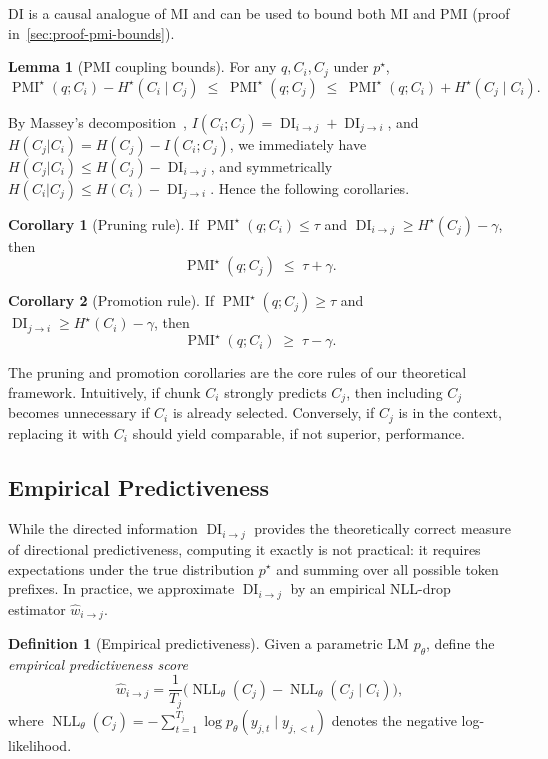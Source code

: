 \documentclass{article} %
\theoremstyle{definition}
\newtheorem{definition}{Definition}[section]
\newtheorem{corollary}{Corollary}[theorem]
\newtheorem{lemma}[theorem]{Lemma}
\DeclareMathOperator{\NLL}{NLL}
\DeclareMathOperator{\DI}{DI}
\DeclareMathOperator{\PMI}{PMI}
\begin{document}
DI is a causal analogue of MI and can be used to bound both MI and PMI (proof in~\ref{sec:proof-pmi-bounds}).

\begin{lemma}[PMI coupling bounds]
\label{thm:coupling}
For any $q,C_i,C_j$ under $p^\star$,
\[
\operatorname{PMI}^\star(q;C_i) - H^\star(C_i\mid C_j)
\;\le\;
\operatorname{PMI}^\star(q;C_j)
\;\le\;
\operatorname{PMI}^\star(q;C_i) + H^\star(C_j\mid C_i).
\]
\end{lemma}

By Massey's decomposition~\citep{massey1990causality,kim2008coding}, $I(C_i;C_j) = \DI_{i\rightarrow j} + \DI_{j \rightarrow i}$, and $H(C_j|C_i) = H(C_j) - I(C_i;C_j)$, we immediately have $H(C_j|C_i) \le H(C_j) - \DI_{i \rightarrow j}$, and symmetrically $H(C_i|C_j) \le H(C_i) - \DI_{j \rightarrow i}$. Hence the following corollaries.

\begin{corollary}[Pruning rule]
\label{cor:prune}
If $\PMI^\star(q;C_i)\le\tau$ and $\DI_{i\to j} \ge H^\star(C_j)-\gamma$, then
\[
\operatorname{PMI}^\star(q;C_j)\;\le\;\tau+\gamma.
\]
\end{corollary}

\begin{corollary}[Promotion rule]
\label{cor:promote}
If $\PMI^\star(q;C_j)\ge\tau$ and $\DI_{j\to i} \ge H^\star(C_i)-\gamma$, then
\[
\operatorname{PMI}^\star(q;C_i)\;\ge\;\tau-\gamma.
\]
\end{corollary}

The pruning and promotion corollaries are the core rules of our theoretical framework. Intuitively, if chunk $C_i$ strongly predicts $C_j$, then including $C_j$ becomes unnecessary if $C_i$ is already selected. Conversely, if $C_j$ is in the context, replacing it with $C_i$ should yield comparable, if not superior, performance.

\subsection{Empirical Predictiveness}

While the directed information $\DI_{i \to j}$ provides the theoretically correct measure of directional predictiveness, computing it exactly is not practical: it requires expectations under the true distribution $p^\star$ and summing over all possible token prefixes. In practice, we approximate 
$\DI_{i\to j}$ by an empirical NLL-drop estimator $\hat{w}_{i\to j}$.

\begin{definition}[Empirical predictiveness]\label{def:hat_w}
Given a parametric LM $p_\theta$, define the \emph{empirical predictiveness score}
\[
\hat{w}_{i\to j}
= \frac{1}{T_j}\Big(\NLL_\theta(C_j) - \NLL_\theta(C_j\mid C_i)\Big),
\]
where $\NLL_\theta(C_j) = -\!\!\sum_{t=1}^{T_j}\log p_\theta(y_{j,t}\mid y_{j,<t})$ denotes the negative log-likelihood.
\end{definition}
\end{document}
